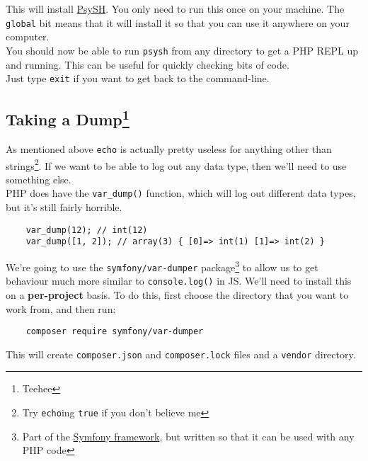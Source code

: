 This will install \href{https://psysh.org/}{PsySH}. You only need to run this once on your machine. The \texttt{global} bit means that it will install it so that you can use it anywhere on your computer.
\\

You should now be able to run \texttt{psysh} from any directory to get a PHP REPL up and running. This can be useful for quickly checking bits of code.
\\

Just type \texttt{exit} if you want to get back to the command-line.

\subsection[Taking a Dump]{Taking a Dump\footnote{Teehee}}

As mentioned above \texttt{echo} is actually pretty useless for anything other than strings\footnote{Try \texttt{echo}ing \texttt{true} if you don't believe me}. If we want to be able to log out any data type, then we'll need to use something else.
\\

PHP does have the \texttt{var\_dump()} function, which will log out different data types, but it's still fairly horrible.

\begin{verbatim}
    var_dump(12); // int(12)
    var_dump([1, 2]); // array(3) { [0]=> int(1) [1]=> int(2) }
\end{verbatim}

We're going to use the \texttt{symfony/var-dumper} package\footnote{Part of the \href{https://symfony.com/}{Symfony framework}, but written so that it can be used with any PHP code} to allow us to get behaviour much more similar to \texttt{console.log()} in JS. We'll need to install this on a \textbf{per-project} basis. To do this, first choose the directory that you want to work from, and then run:

\begin{verbatim}
    composer require symfony/var-dumper
\end{verbatim}

This will create \texttt{composer.json} and \texttt{composer.lock} files and a \texttt{vendor} directory.

